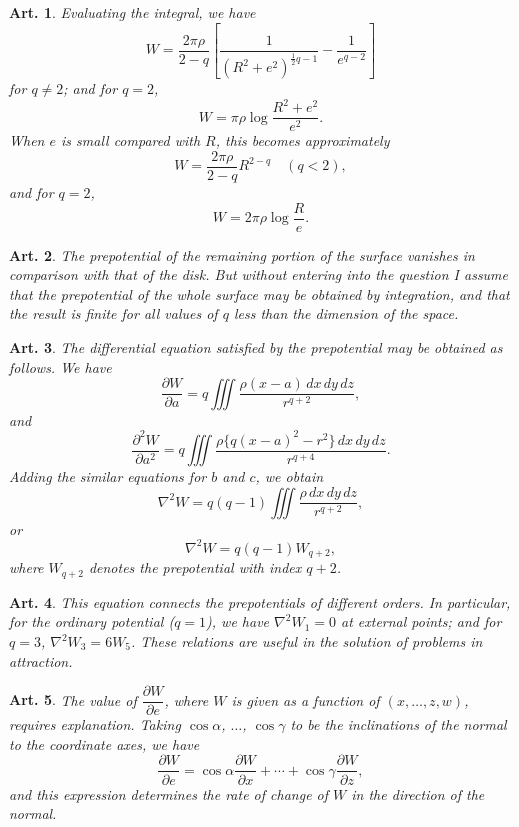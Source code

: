 \documentclass[12pt,a4paper]{article}
\theoremstyle{cayley}
\newtheorem{art}{Art.}[section]
\begin{document}
\begin{art}
Evaluating the integral, we have
\[
W = \frac{2\pi\rho}{2-q}\left[\frac{1}{(R^2+e^2)^{\frac{1}{2}q-1}} - \frac{1}{e^{q-2}}\right]
\]
for $q \neq 2$; and for $q=2$,
\[
W = \pi\rho\log\frac{R^2+e^2}{e^2}.
\]
When $e$ is small compared with $R$, this becomes approximately
\[
W = \frac{2\pi\rho}{2-q}R^{2-q} \quad (q < 2),
\]
and for $q = 2$,
\[
W = 2\pi\rho\log\frac{R}{e}.
\]
\end{art}

\begin{art}
The prepotential of the remaining portion of the surface vanishes in comparison with that of the disk. But without entering into the question I assume that the prepotential of the whole surface may be obtained by integration, and that the result is finite for all values of $q$ less than the dimension of the space.
\end{art}

\begin{art}
The differential equation satisfied by the prepotential may be obtained as follows. We have
\[
\frac{\partial W}{\partial a} = q \iiint \frac{\rho(x-a)\,dx\,dy\,dz}{r^{q+2}},
\]
and
\[
\frac{\partial^2 W}{\partial a^2} = q \iiint \frac{\rho\{q(x-a)^2 - r^2\}\,dx\,dy\,dz}{r^{q+4}}.
\]
Adding the similar equations for $b$ and $c$, we obtain
\[
\nabla^2 W = q(q-1) \iiint \frac{\rho\,dx\,dy\,dz}{r^{q+2}},
\]
or
\[
\nabla^2 W = q(q-1) W_{q+2},
\]
where $W_{q+2}$ denotes the prepotential with index $q+2$.
\end{art}

\begin{art}
This equation connects the prepotentials of different orders. In particular, for the ordinary potential ($q=1$), we have $\nabla^2 W_1 = 0$ at external points; and for $q=3$, $\nabla^2 W_3 = 6 W_5$. These relations are useful in the solution of problems in attraction.
\end{art}

\begin{art}
The value of $\dfrac{\partial W}{\partial e}$, where $W$ is given as a function of $(x, \ldots, z, w)$, requires explanation. Taking $\cos\alpha$, $\ldots$, $\cos\gamma$ to be the inclinations of the normal to the coordinate axes, we have
\[
\frac{\partial W}{\partial e} = \cos\alpha \frac{\partial W}{\partial x} + \cdots + \cos\gamma \frac{\partial W}{\partial z},
\]
and this expression determines the rate of change of $W$ in the direction of the normal.
\end{art}
\end{document}
